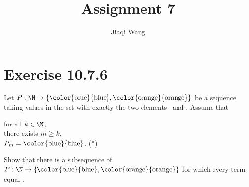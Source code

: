 \documentclass[problem]{classnotes}
\title{Assignment 7}
\author{Jiaqi Wang}
\newcommand{\blue}{\text{\color{blue}{blue}}}
\newcommand{\orange}{\text{\color{orange}{orange}}}
\begin{document}
    \maketitle
    \section{Exercise 10.7.6}
    \begin{problem}
        Let $P: \N \to \{\blue, \orange\}$ be a sequence taking values in the set with exactly the two elements \blue\ and \orange.
        Assume that
        \begin{center}
            \parbox{\linewidth}{
                \linewidth
                for all $k \in \N$, \\
                \hspace*{1em}there exists $m \ge k$, \\
                \hspace*{2em}$P_m = \blue$. \hfill (*)

            }
        \end{center}

        Show that there is a subsequence of $P: \N \to \{\blue, \orange\}$ for which every term equal \blue.%
    \end{problem}
\end{document}
